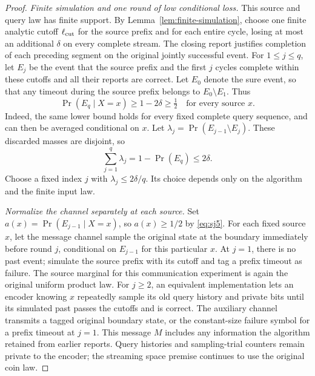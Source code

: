 \documentclass[11pt,letterpaper]{article}
\numberwithin{equation}{section}
\begin{document}
\begin{proof}
\emph{Finite simulation and one round of low conditional loss.} This source and query law has finite support.
By Lemma~\ref{lem:finite-simulation}, choose one finite analytic cutoff $\ell_{\rm cut}$ for the source prefix and for each entire cycle, losing at most an additional $\delta$ on every complete stream.
The closing report justifies completion of each preceding segment on the original jointly successful event.
For $1\le j\le q$, let $E_j$ be the event that the source prefix and the first $j$ cycles complete within these cutoffs and all their reports are correct.
Let $E_0$ denote the sure event, so that any timeout during the source prefix belongs to $E_0\setminus E_1$.
Thus
\begin{equation}
\Pr(E_q\mid X=x)\ge1-2\delta\ge\tfrac12
       \quad\text{for every source }x.             \label{eq:sj5}
\end{equation}
Indeed, the same lower bound holds for every fixed complete query sequence, and can then be averaged conditional on $x$.
Let $\lambda_j=\Pr(E_{j-1}\setminus E_j)$.
These discarded masses are disjoint, so
\begin{equation}
\sum_{j=1}^q\lambda_j=1-\Pr(E_q)\le2\delta.       \label{eq:sj6}
\end{equation}
Choose a fixed index $j$ with $\lambda_j\le2\delta/q$.
Its choice depends only on the algorithm and the finite input law.

\emph{Normalize the channel separately at each source.} Set $a(x)=\Pr(E_{j-1}\mid X=x)$, so $a(x)\ge1/2$ by \eqref{eq:sj5}.
For each fixed source $x$, let the message channel sample the original state at the boundary immediately before round $j$, conditional on $E_{j-1}$ for this particular $x$.
At $j=1$, there is no past event; simulate the source prefix with its cutoff and tag a prefix timeout as failure.
The source marginal for this communication experiment is again the original uniform product law.
For $j\ge2$, an equivalent implementation lets an encoder knowing $x$ repeatedly sample its old query history and private bits until its simulated past passes the cutoffs and is correct.
The auxiliary channel transmits a tagged original boundary state, or the constant-size failure symbol for a prefix timeout at $j=1$.
This message $M$ includes any information the algorithm retained from earlier reports.
Query histories and sampling-trial counters remain private to the encoder; the streaming space premise continues to use the original coin law.


\end{proof}
\end{document}
